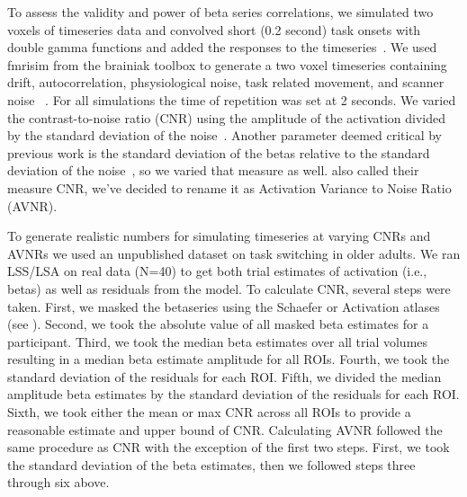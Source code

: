 \documentclass[10pt,letterpaper]{article}
\begin{document}
To assess the validity and power of beta series correlations,
we simulated two voxels of timeseries data and convolved short (0.2 second)
task onsets with double gamma functions
and added the responses to the timeseries~\cite{Glover1999,Welvaert2011}.
We used fmrisim from the brainiak toolbox to generate a two voxel timeseries
containing drift, autocorrelation, phsysiological noise,
task related movement, and scanner noise ~\cite{Ellis2020}.
For all simulations the time of repetition was set at 2 seconds.
We varied the contrast-to-noise ratio (CNR) using the amplitude of the activation
divided by the standard deviation of the noise~\cite{Welvaert2013a}.
Another parameter deemed critical by previous work is the standard deviation
of the betas relative to the standard deviation of the noise~\cite{Abdulrahman2016},
so we varied that measure as well.
\cite[Since Abdulrahman \& Henson (2016)]{Abdulrahman2016} also called their measure
CNR, we've decided to rename it as Activation Variance to Noise Ratio (AVNR).

To generate realistic numbers for simulating timeseries at varying CNRs and AVNRs
we used an unpublished dataset on task switching in older adults.
We ran LSS/LSA on real data (N=40) to get both trial estimates of activation (i.e., betas)
as well as residuals from the model.
To calculate CNR, several steps were taken.
First, we masked the betaseries using the Schaefer or Activation atlases (see ).
Second, we took the absolute value of all masked beta estimates for a participant.
Third, we took the median beta estimates over all trial volumes resulting
in a median beta estimate amplitude for all ROIs.
Fourth, we took the standard deviation of the residuals for each ROI.
Fifth, we divided the median amplitude beta estimates by the standard deviation of the residuals
for each ROI.
Sixth, we took either the mean or max CNR across all ROIs to provide a reasonable estimate
and upper bound of CNR.
Calculating AVNR followed the same procedure as CNR with the exception of the first two steps.
First, we took the standard deviation of the beta estimates, then we followed steps three through six above.
\end{document}
